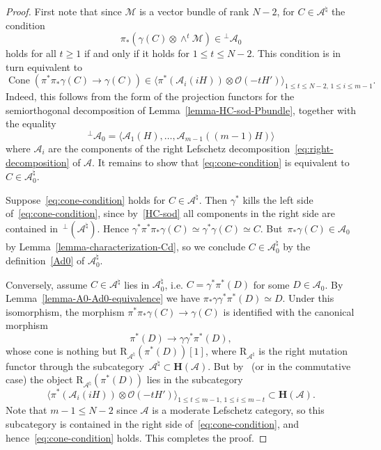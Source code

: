 \documentclass[11pt, reqno]{amsart}
\numberwithin{equation}{section}
\theoremstyle{plain}
\theoremstyle{definition}
\newcommand{\hpd}{{\natural}}
\newcommand{\cAd}{\cA^\hpd}
\newcommand{\cO}{\mathcal{O}}
\newcommand{\cA}{\mathcal{A}}
\newcommand{\cM}{\mathcal{M}}
\newcommand{\rR}{\mathrm{R}}
\newcommand{\bH}{\mathbf{H}}
\begin{document}
\begin{proof}
First note that since $\cM$ is a vector bundle of rank $N - 2$, for 
$C \in \cAd$ the condition  
\begin{equation*}
\pi_*(\gamma(C) \otimes \wedge^t \cM) \in {}^\perp\cA_0
\end{equation*} 
holds for all $t \geq 1$ if and only if it holds for $1 \leq t \leq N-2$. 
This condition is in turn equivalent to 
\begin{equation}
\label{eq:cone-condition}
\operatorname{Cone}(\pi^*\pi_*\gamma(C) \to \gamma(C)) \in 
\Big\langle \pi^*{\left( \cA_i(iH) \right)} \otimes \cO(-tH') \Big\rangle_{1 \leq t \leq N-2, \, 1 \leq i \leq m-1}.
\end{equation} 
Indeed, this follows from the form of the projection functors for the 
semiorthogonal decomposition of Lemma~\ref{lemma-HC-sod-Pbundle}, together with  
the equality  
\begin{equation*}
{}^\perp\cA_0 = \langle \cA_1(H), \dots, \cA_{m-1}((m-1)H) \rangle
\end{equation*}
where $\cA_i$ are the components of the right Lefschetz decomposition~\eqref{eq:right-decomposition} of $\cA$. 
It remains to show that \eqref{eq:cone-condition} is equivalent to $C \in \cAd_0$. 

Suppose~\eqref{eq:cone-condition} holds for $C \in \cAd$. 
Then $\gamma^*$ kills the left side of~\eqref{eq:cone-condition},
since by~\eqref{HC-sod} all components in the right side 
are contained in~${}^{\perp}(\cAd)$. 
Hence $\gamma^* \pi^* \pi_* \gamma(C) \simeq \gamma^* \gamma(C) \simeq C$. 
But~$\pi_* \gamma(C) \in \cA_0$ by Lemma~\ref{lemma-characterization-Cd}, 
so we conclude $C \in \cAd_0$ by the definition~\eqref{Ad0} of $\cAd_0$. 

Conversely, assume $C \in \cAd$ lies in $\cAd_0$, i.e. $C = \gamma^* \pi^*(D)$ 
for some $D \in \cA_0$. 
By Lemma~\ref{lemma-A0-Ad0-equivalence} we have 
$\pi_* \gamma  \gamma^* \pi^*(D) \simeq D$. 
Under this isomorphism, the morphism $\pi^* \pi_* \gamma(C) \to \gamma(C)$
is identified with the canonical morphism 
\begin{equation*}
\pi^*(D) \to \gamma \gamma^* \pi^*(D) , 
\end{equation*}
whose cone is nothing but $\rR_{\cAd}(\pi^*(D))[1]$, where $\rR_{\cAd}$ is the right mutation functor 
through the subcategory~$\cAd \subset \bH(\cA)$. 
But by~\cite[Lemma 7.8]{NCHPD} (or \cite[Lemma~5.6]{kuznetsov-hpd} in the commutative case) 
the object $\rR_{\cAd}(\pi^*(D))$ lies in the subcategory 
\begin{equation*}
\Big\langle \pi^*{\left( \cA_i(iH) \right)} \otimes \cO(-tH') \Big\rangle_{1 \leq t \leq m-1, \, 1 \leq i \leq m-t} \subset \bH(\cA) .
\end{equation*}
Note that $m-1 \leq N-2$ since $\cA$ is a moderate Lefschetz category, so 
this subcategory is contained in the right side of~\eqref{eq:cone-condition}, and hence~\eqref{eq:cone-condition} holds. 
This completes the proof.  
\end{proof}
\end{document}

